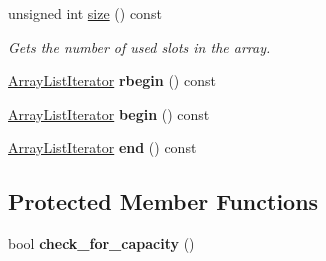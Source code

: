 \begin{DoxyCompactItemize}
unsigned int \mbox{\hyperlink{classssuds_1_1_array_list_adbcd61184deb92c36610e47b91a7b6d5}{size}} () const
\begin{DoxyCompactList}\small\item\em Gets the number of {\itshape used} slots in the array. \end{DoxyCompactList}\item 
\mbox{\label{classssuds_1_1_array_list_abfcec39c654ee0a0d25d033809b1af44}} 
\mbox{\hyperlink{classssuds_1_1_array_list_1_1_array_list_iterator}{Array\+List\+Iterator}} {\bfseries rbegin} () const
\item 
\mbox{\label{classssuds_1_1_array_list_a1b21ab65dae2e027da6d40e1214ebb6c}} 
\mbox{\hyperlink{classssuds_1_1_array_list_1_1_array_list_iterator}{Array\+List\+Iterator}} {\bfseries begin} () const
\item 
\mbox{\label{classssuds_1_1_array_list_ae89f6f81f6ab34575525ed973c81146d}} 
\mbox{\hyperlink{classssuds_1_1_array_list_1_1_array_list_iterator}{Array\+List\+Iterator}} {\bfseries end} () const
\end{DoxyCompactItemize}
\subsection*{Protected Member Functions}
\begin{DoxyCompactItemize}
\item 
\mbox{\label{classssuds_1_1_array_list_ad87b3f13b75f7a80dd86e58fb96d19f8}} 
bool {\bfseries check\+\_\+for\+\_\+capacity} ()
\end{DoxyCompactItemize}
